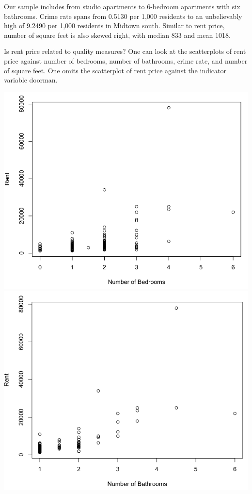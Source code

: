 \documentclass[a4 paper, 11 pt, twocolumn]{article}
\begin{document}
Our sample includes from studio apartments to 6-bedroom apartments with six bathrooms. Crime rate spans from 0.5130 per 1,000 residents to an unbelievably high of 9.2490 per 1,000 residents in Midtown south. Similar to rent price, number of square feet is also skewed right, with median 833 and mean 1018.

Is rent price related to quality measures? One can look at the scatterplots of rent price against number of bedrooms, number of bathrooms, crime rate, and number of square feet. One omits the scatterplot of rent price against the indicator variable doorman.
\begin{center}
\includegraphics[scale=0.3]{scatter1}
\includegraphics[scale=0.3]{scatter2}

\end{center}
\end{document}
